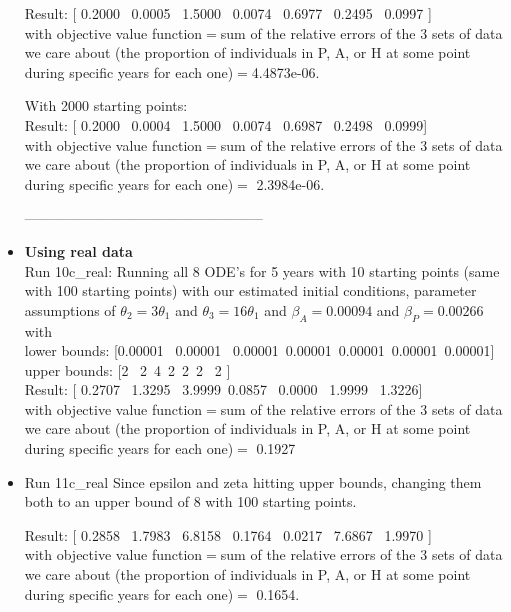 \documentclass[12pt]{article}
\begin{document}
\begin{itemize}
Result: [ 0.2000  \  0.0005  \  1.5000 \   0.0074  \  0.6977  \  0.2495 \   0.0997 ]\\
with objective value function$=$sum of the relative errors of the 3 sets of data we care about (the proportion of individuals in P, A, or H at some point during specific years for each one)$=$4.4873e-06.


With 2000 starting points: \\
Result: [   0.2000  \  0.0004 \   1.5000 \   0.0074 \   0.6987  \  0.2498 \   0.0999]\\
with objective value function$=$sum of the relative errors of the 3 sets of data we care about (the proportion of individuals in P, A, or H at some point during specific years for each one)$=$   2.3984e-06. 

--------------------------------------------------- \\

\item \textbf{Using real data} \\
Run 10c\_real: Running all 8 ODE's for 5 years with 10 starting points (same with 100 starting points) with our estimated initial conditions, parameter assumptions of $\theta_2=3 \theta_1$ and $\theta_3=16\theta_1$ and $\beta_A=0.00094$ and $\beta_P=0.00266$ with \\
lower bounds: [0.00001  \ 0.00001 \ 0.00001\ 0.00001\ 0.00001\ 0.00001\ 0.00001] \\
upper bounds: [2 \ 2\  4\  2\  2\   2 \ 2 ] \\

Result: [ 0.2707 \   1.3295  \  3.9999\    0.0857  \  0.0000 \   1.9999   \ 1.3226]\\
with objective value function$=$sum of the relative errors of the 3 sets of data we care about (the proportion of individuals in P, A, or H at some point during specific years for each one)$=$  0.1927


\item Run 11c\_real Since epsilon and zeta hitting upper bounds, changing them both to an upper bound of 8 with 100 starting points. 

Result: [  0.2858  \  1.7983   \ 6.8158  \  0.1764  \  0.0217  \  7.6867  \  1.9970 ]\\
with objective value function$=$sum of the relative errors of the 3 sets of data we care about (the proportion of individuals in P, A, or H at some point during specific years for each one)$=$  0.1654.

\pagebreak



\end{itemize}
\end{document}
